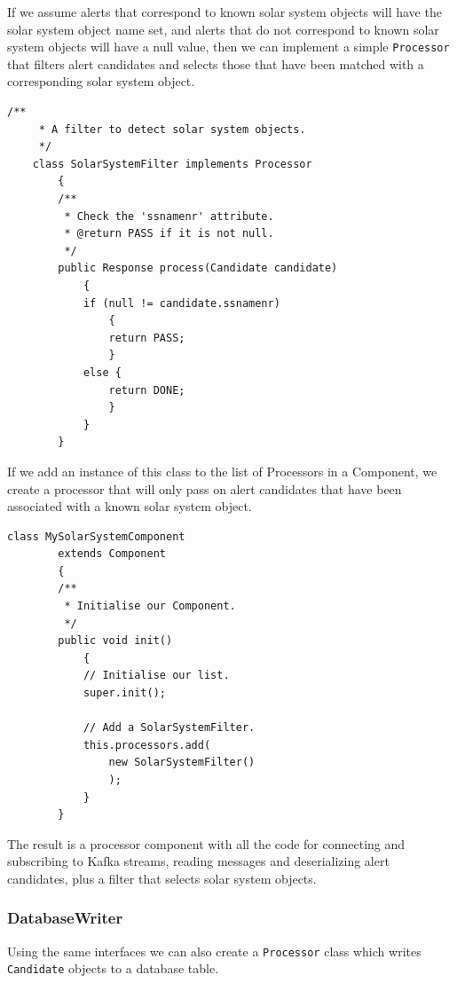 \documentclass{article}
\newcommand{\kafka} {Kafka\xspace}
\newcommand{\javaname}[1] {{\ttfamily\color{codeblue} #1}}
\begin{document}
If we assume alerts that correspond to known solar system objects will have the solar system object name set, and alerts that do not correspond to known solar system objects will have a null value, then we can implement a simple \texttt{Processor} that filters alert candidates and selects those that have been matched with a corresponding solar system object.

\begin{lstlisting}[style=Java]
    /**
     * A filter to detect solar system objects.
     */
    class SolarSystemFilter implements Processor
        {
        /**
         * Check the 'ssnamenr' attribute.
         * @return PASS if it is not null.
         */
        public Response process(Candidate candidate)
            {
            if (null != candidate.ssnamenr)
                {
                return PASS;
                }
            else {
                return DONE;
                }
            }
        }
\end{lstlisting}

If we add an instance of this class to the list of \javaname{Processors} in a \javaname{Component}, we create a processor that will only pass on alert candidates that have been associated with a known solar system object.

\begin{lstlisting}[style=Java]
    class MySolarSystemComponent
        extends Component
        {
        /**
         * Initialise our Component.
         */
        public void init()
            {
            // Initialise our list.
            super.init();

            // Add a SolarSystemFilter.
            this.processors.add(
                new SolarSystemFilter()
                );
            }
        }
\end{lstlisting}

The result is a processor component with all the code for connecting and subscribing to \kafka streams, reading messages and deserializing alert candidates, plus a filter that selects solar system objects.

\subsubsection{DatabaseWriter}
\label{java-interfaces.DatabaseWriter}

Using the same interfaces we can also create a \texttt{Processor} class which writes \texttt{Candidate} objects to a database table.
\end{document}
